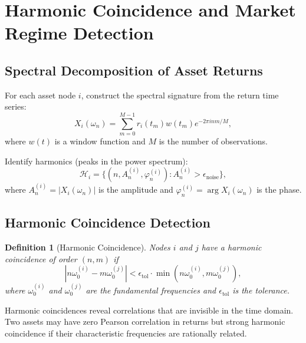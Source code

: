 \documentclass[twocolumn,10pt]{article}
\newtheorem{definition}[theorem]{Definition}
\theoremstyle{remark}
\begin{document}
\section{Harmonic Coincidence and Market Regime Detection}
\label{sec:harmonic}

\subsection{Spectral Decomposition of Asset Returns}

For each asset node $i$, construct the spectral signature from the return time series:
\begin{equation}
    X_i(\omega_n) = \sum_{m=0}^{M-1} r_i(t_m) w(t_m) e^{-2\pi i n m / M},
    \label{eq:fft_returns}
\end{equation}
where $w(t)$ is a window function and $M$ is the number of observations.

Identify harmonics (peaks in the power spectrum):
\begin{equation}
    \mathcal{H}_i = \{(n, A_n^{(i)}, \varphi_n^{(i)}) : A_n^{(i)} > \epsilon_{\text{noise}}\},
    \label{eq:harmonics}
\end{equation}
where $A_n^{(i)} = |X_i(\omega_n)|$ is the amplitude and $\varphi_n^{(i)} = \arg X_i(\omega_n)$ is the phase.

\subsection{Harmonic Coincidence Detection}

\begin{definition}[Harmonic Coincidence]
\label{def:harmonic_coincidence}
Nodes $i$ and $j$ have a \emph{harmonic coincidence} of order $(n, m)$ if
\begin{equation}
    |n \omega_0^{(i)} - m \omega_0^{(j)}| < \epsilon_{\text{tol}} \cdot \min(n\omega_0^{(i)}, m\omega_0^{(j)}),
    \label{eq:harmonic_coincidence}
\end{equation}
where $\omega_0^{(i)}$ and $\omega_0^{(j)}$ are the fundamental frequencies and $\epsilon_{\text{tol}}$ is the tolerance.
\end{definition}

Harmonic coincidences reveal correlations that are invisible in the time domain.  Two assets may have zero Pearson correlation in returns but strong harmonic coincidence if their characteristic frequencies are rationally related.
\end{document}
